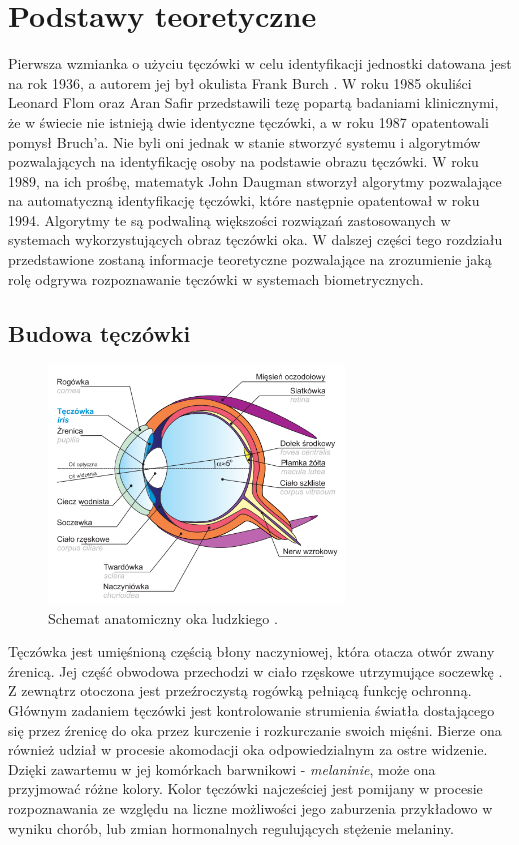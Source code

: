 \chapter{Podstawy teoretyczne}

Pierwsza wzmianka o użyciu tęczówki w celu identyfikacji jednostki datowana jest na rok
1936, a autorem jej był okulista Frank Burch \cite{FBIGov}. W roku 1985 okuliści Leonard Flom oraz
Aran Safir przedstawili tezę popartą badaniami klinicznymi, że w świecie nie istnieją dwie
identyczne tęczówki, a w roku 1987 opatentowali pomysł Bruch'a. Nie byli oni jednak w
stanie stworzy\'c systemu i algorytmów pozwalających na identyfikację osoby na podstawie
obrazu tęczówki. W roku 1989, na ich prośbę, matematyk John Daugman stworzył algorytmy
pozwalające na automatyczną identyfikację tęczówki, które następnie opatentował w roku 1994.
\cite{Misztal2012}
Algorytmy te są podwaliną większości rozwiąza\'n zastosowanych w systemach wykorzystujących
obraz tęczówki oka. W dalszej części tego rozdziału przedstawione zostaną informacje teoretyczne
pozwalające na zrozumienie jaką rolę odgrywa rozpoznawanie tęczówki w systemach biometrycznych.

\section{Budowa tęczówki}

\begin{figure}[ht]
  \centering
  \includegraphics[width=0.7\textwidth]{images/intro/eyeStructure.png}
  \caption{Schemat anatomiczny oka ludzkiego \cite{Czajka}.}
  \label{fig:eyeStructure}
\end{figure}

Tęczówka jest umięśnioną częścią błony naczyniowej, która otacza otwór zwany \'zrenicą.
Jej częś\'c obwodowa przechodzi w ciało rzęskowe utrzymujące soczewkę \cite{Czajka}. Z zewnątrz
otoczona jest prze\'zroczystą rogówką pełniącą funkcję ochronną. Głównym zadaniem tęczówki
jest kontrolowanie strumienia światła dostającego się przez \'zrenicę do oka przez kurczenie i
rozkurczanie swoich mięśni. Bierze ona również udział w procesie akomodacji oka odpowiedzialnym
za ostre widzenie. Dzięki zawartemu w jej komórkach barwnikowi - \textit{melaninie}, może ona przyjmowa\'c różne kolory.
Kolor tęczówki najcześciej jest pomijany w procesie rozpoznawania ze względu na liczne możliwości
jego zaburzenia przykładowo w wyniku chorób, lub zmian hormonalnych regulujących stężenie melaniny.

